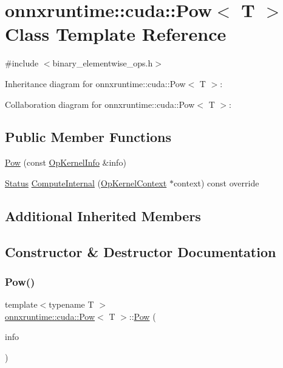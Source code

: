 \hypertarget{classonnxruntime_1_1cuda_1_1Pow}{}\section{onnxruntime\+:\+:cuda\+:\+:Pow$<$ T $>$ Class Template Reference}
\label{classonnxruntime_1_1cuda_1_1Pow}


{\ttfamily \#include $<$binary\+\_\+elementwise\+\_\+ops.\+h$>$}



Inheritance diagram for onnxruntime\+:\+:cuda\+:\+:Pow$<$ T $>$\+:


Collaboration diagram for onnxruntime\+:\+:cuda\+:\+:Pow$<$ T $>$\+:
\subsection*{Public Member Functions}
\begin{DoxyCompactItemize}
\item 
\mbox{\hyperlink{classonnxruntime_1_1cuda_1_1Pow_a2ea3065f85f275a6b4bcc4eb2bffafc0}{Pow}} (const \mbox{\hyperlink{classonnxruntime_1_1OpKernelInfo}{Op\+Kernel\+Info}} \&info)
\item 
\mbox{\hyperlink{classonnxruntime_1_1common_1_1Status}{Status}} \mbox{\hyperlink{classonnxruntime_1_1cuda_1_1Pow_a8d0954d35262ed182961ca491c4ffee7}{Compute\+Internal}} (\mbox{\hyperlink{classonnxruntime_1_1OpKernelContext}{Op\+Kernel\+Context}} $\ast$context) const override
\end{DoxyCompactItemize}
\subsection*{Additional Inherited Members}


\subsection{Constructor \& Destructor Documentation}
\mbox{\label{classonnxruntime_1_1cuda_1_1Pow_a2ea3065f85f275a6b4bcc4eb2bffafc0}} 
\subsubsection{\texorpdfstring{Pow()}{Pow()}}
{\footnotesize\ttfamily template$<$typename T $>$ \\
\mbox{\hyperlink{classonnxruntime_1_1cuda_1_1Pow}{onnxruntime\+::cuda\+::\+Pow}}$<$ T $>$\+::\mbox{\hyperlink{classonnxruntime_1_1cuda_1_1Pow}{Pow}} (\begin{DoxyParamCaption}\item[{const \mbox{\hyperlink{classonnxruntime_1_1OpKernelInfo}{Op\+Kernel\+Info}} \&}]{info }\end{DoxyParamCaption})\hspace{0.3cm}{\ttfamily [inline]}}



